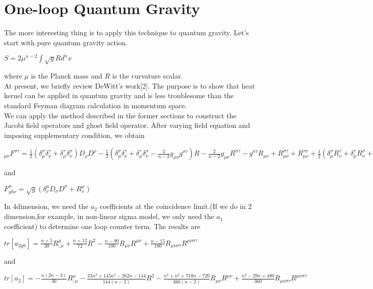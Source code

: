 \documentclass[a4paper,12 pt]{article}
\begin{document}
\section{One-loop Quantum Gravity}
The more interesting thing is to apply this technique to quantum
gravity. Let's start with pure quantum gravity action.
\begin{center}
$ S = 2\mu^{n-2}\int \sqrt{g}R d^{n}x$
\end{center}
where $\mu$ is the Planck mass and $R$ is the curvature scalar.\\
At present, we briefly review DeWitt's work[2]. The purpose is to
show that heat kernel can be applied in quantum gravity and is
less troublesome than the standard Feyman diagram calculation in momentum space. \\
We can apply the method described in the former sections to
construct the Jacobi field operators and ghost field operator.
After varying field equation and imposing supplementary condition,
we obtain
\begin{center}
$ _{\mu\nu}F^{\sigma\tau} =
\frac{1}{2}(\delta_{\mu}^{\sigma}\delta_{\nu}^{\tau}+\delta_{\mu}^{\tau}\delta_{\nu}^{\sigma})D_{\rho}D^{\rho}
-
\frac{1}{2}(\delta_{\mu}^{\sigma}\delta_{\nu}^{\tau}+\delta_{\mu}^{\tau}\delta_{\nu}^{\sigma}
- \frac{2}{n-2}g_{\mu\nu}g^{\sigma\tau})R -
\frac{2}{n-2}g_{\mu\nu}R^{\sigma\tau} - g^{\sigma\tau}R_{\mu\nu} +
 R_{\mu\nu}^{\sigma\tau} + R_{\mu\nu}^{\tau\sigma} +
\frac{1}{2}(\delta_{\mu}^{\sigma}R_{\nu}^{\tau}+\delta_{\mu}^{\tau}R_{\nu}^{\sigma}
+ \delta_{\nu}^{\sigma}R_{\mu}^{\tau} +
\delta_{\nu}^{\tau}R_{\mu}^{\sigma}) $
\end{center}
and
\begin{center}
$ F_{gh\nu}^{\mu} =
\sqrt{g}(\delta^{\mu}_{\nu}D_{\sigma}D^{\sigma}+ R^{\mu}_{\nu})$
\end{center}
In $4 $dimension, we need the $a_{2}$ coefficients at the
coincidence limit.(If we do in 2 dimension,for example, in
non-linear sigma model, we only need the $a_{1}$ coefficient) to
determine one loop counter term. The results are
\begin{center}
$tr[a_{2gh}] = \frac{n+5}{30} R_{;\mu}^{\mu} +
\frac{n+12}{72}R^{2}-\frac{n-90}{180}R_{\mu\nu}R^{\mu\nu}+
\frac{n-15}{180}R_{\mu\nu\sigma\tau}R^{\mu\nu\sigma\tau}$
\end{center}
and
\begin{center}
$ tr[a_{2}] = - \frac{n(2n-3)}{30}R_{;\mu}^{\mu} -
\frac{23n^{3}+145n^{2}-262n-144}{144(n-2)}R^{2} -
\frac{n^{3}+n^{2}+718n-720}{360(n-2)}R_{\mu\nu}R^{\mu\nu} +
\frac{n^{2}-29n+480}{360}R_{\mu\nu\sigma\tau}R^{\mu\nu\sigma\tau}$
\end{center}
\end{document}
